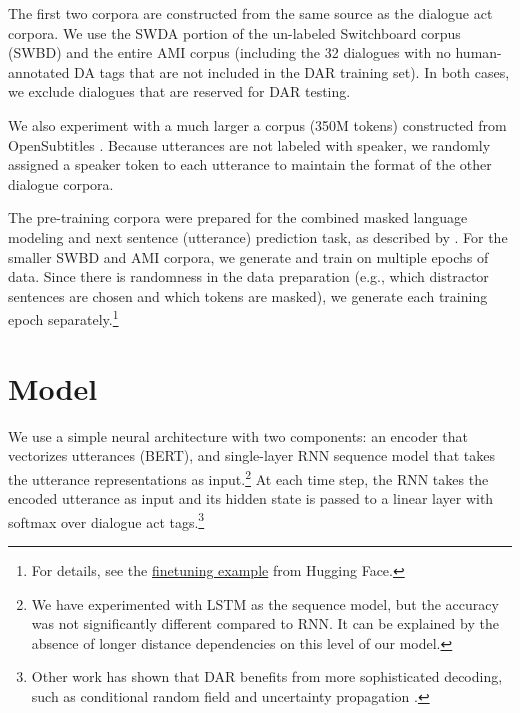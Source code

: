 \documentclass[11pt,a4paper]{article}
\begin{document}
The first two corpora are constructed from the same source as the dialogue act corpora.
We use the SWDA portion of the un-labeled Switchboard corpus (SWBD) and the entire AMI corpus (including the 32 dialogues with no human-annotated DA tags that are not included in the DAR training set).
In both cases, we exclude dialogues that are reserved for DAR testing.

We also experiment with a much larger a corpus (350M tokens) constructed from OpenSubtitles \citep{Lison2016}.
Because utterances are not labeled with speaker, we randomly assigned a speaker token to each utterance to maintain the format of the other dialogue corpora.

The pre-training corpora were prepared for the combined masked language modeling and next sentence (utterance) prediction task, as described by \citet{devlinBERTPretrainingDeep2018}.
For the smaller SWBD and AMI corpora, we generate and train on multiple epochs of data. Since there is randomness in the data preparation (e.g., which distractor sentences are chosen and which tokens are masked), we generate each training epoch separately.\footnote{For details, see the \href{https://github.com/huggingface/transformers/tree/1.1.0/examples/lm_finetuning}{finetuning example} from Hugging Face.}

\section{Model} %

We use a simple neural architecture with two components: 
an encoder that vectorizes utterances (BERT), 
and single-layer RNN sequence model that takes the utterance representations as input.\footnote{
We have experimented with LSTM as the sequence model, but the accuracy was not significantly different compared to RNN. It can be explained by the absence of longer distance dependencies on this level of our model.}
At each time step, the RNN takes the encoded utterance as input 
and its hidden state is passed to a linear layer with softmax over dialogue act tags.\footnote{
Other work has shown that DAR benefits from more sophisticated decoding, such as conditional random field \citep{chenDialogueActRecognition2017} and uncertainty propagation \citep{tranPreservingDistributionalInformation2017}.}
\end{document}
